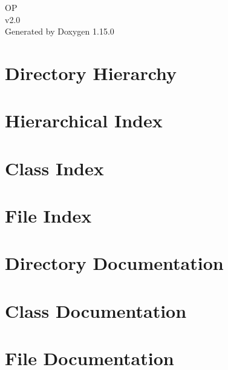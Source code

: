 \documentclass[twoside]{book}
\newcommand{\+}{\discretionary{\mbox{\scriptsize$\hookleftarrow$}}{}{}}
\newcommand{\clearemptydoublepage}{%
    \newpage{\pagestyle{empty}\cleardoublepage}%
  }
\begin{document}
  \raggedbottom
    \hypersetup{pageanchor=false,
                bookmarksnumbered=true,
                pdfencoding=unicode
               }
  \begin{titlepage}
  \vspace*{7cm}
  \begin{center}%
  {\Large OP}\\
  [1ex]\large v2.\+0 \\
  \vspace*{1cm}
  {\large Generated by Doxygen 1.15.0}\\
  \end{center}
  \end{titlepage}
  \clearemptydoublepage
  \tableofcontents
  \clearemptydoublepage
  \hypersetup{pageanchor=true}
\chapter{Directory Hierarchy}

\chapter{Hierarchical Index}

\chapter{Class Index}

\chapter{File Index}

\chapter{Directory Documentation}

\chapter{Class Documentation}








\chapter{File Documentation}











  \backmatter
  \newpage
  \clearemptydoublepage
  \printindex
\end{document}
